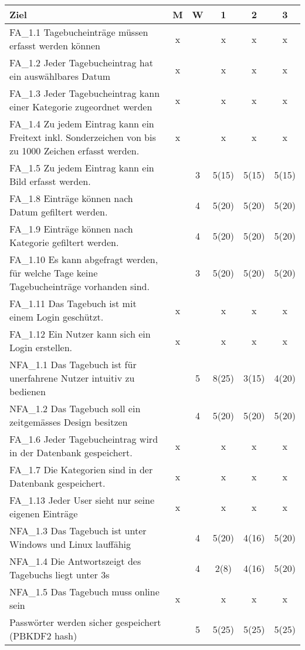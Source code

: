 \begin{longtable}{ p{10cm}|c|c|ccc  }
    \textbf{Ziel} & \textbf{M} & \textbf{W}& \textbf{1}& \textbf{2}& \textbf{3} \\
    \hline
    FA\_1.1 Tagebucheinträge müssen erfasst werden können & x & &x&x&x\\
    FA\_1.2 Jeder Tagebucheintrag hat ein auswählbares Datum & x &&x&x&x \\
    FA\_1.3 Jeder Tagebucheintrag kann einer Kategorie zugeordnet werden & x &&x&x&x \\
    FA\_1.4 Zu jedem Eintrag kann ein Freitext inkl. Sonderzeichen von bis zu 1000 Zeichen erfasst werden. & x &&x&x&x \\
    FA\_1.5 Zu jedem Eintrag kann ein Bild erfasst werden. & & 3 & 5(15)& 5(15)& 5(15)\\
    FA\_1.8 Einträge können nach Datum gefiltert werden. & & 4 &5(20)&5(20)&5(20)\\
    FA\_1.9 Einträge können nach Kategorie gefiltert werden. & & 4&5(20)&5(20)&5(20) \\
    FA\_1.10 Es kann abgefragt werden, für welche Tage keine Tagebucheinträge vorhanden sind. & & 3&5(20)&5(20)&5(20) \\
    FA\_1.11 Das Tagebuch ist mit einem Login geschützt. & x &&x&x&x \\
    FA\_1.12 Ein Nutzer kann sich ein Login erstellen. & x & &x&x&x\\
    NFA\_1.1 Das Tagebuch ist für unerfahrene Nutzer intuitiv zu bedienen & & 5 & 8(25) & 3(15) & 4(20) \\
    NFA\_1.2 Das Tagebuch soll ein zeitgemässes Design besitzen & & 4 & 5(20)& 5(20)& 5(20) \\
    FA\_1.6 Jeder Tagebucheintrag wird in der Datenbank gespeichert. &x & &x&x&x\\
    FA\_1.7 Die Kategorien sind in der Datenbank gespeichert. & x&&x&x&x \\
    FA\_1.13 Jeder User sieht nur seine eigenen Einträge & x &&x&x&x \\
    NFA\_1.3 Das Tagebuch ist unter Windows und Linux lauffähig & & 4 & 5(20) & 4(16) & 5(20) \\
    NFA\_1.4 Die Antwortszeigt des Tagebuchs liegt unter 3s & & 4 & 2(8) & 4(16) & 5(20) \\
    NFA\_1.5 Das Tagebuch muss online sein & x & &x&x&x\\
    Passwörter werden sicher gespeichert (PBKDF2 hash) & & 5  &5(25)&5(25)&5(25)\\

\end{longtable}
